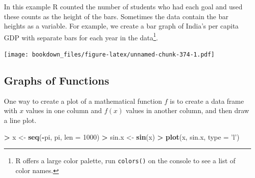 \documentclass[]{krantz}
\makeatletter
\newenvironment{Shaded}{\begin{snugshade}}{\end{snugshade}}
\newcommand{\KeywordTok}[1]{\textcolor[rgb]{0.27,0.27,0.27}{\textbf{#1}}}
\newcommand{\DataTypeTok}[1]{\textcolor[rgb]{0.27,0.27,0.27}{#1}}
\newcommand{\DecValTok}[1]{\textcolor[rgb]{0.06,0.06,0.06}{#1}}
\newcommand{\StringTok}[1]{\textcolor[rgb]{0.5,0.5,0.5}{#1}}
\newcommand{\OperatorTok}[1]{\textcolor[rgb]{0.43,0.43,0.43}{\textbf{#1}}}
\newcommand{\NormalTok}[1]{#1}
\newenvironment{kframe}{%
\medskip{}
\setlength{\fboxsep}{.8em}
 \def\at@end@of@kframe{}%
 \ifinner\ifhmode%
  \def\at@end@of@kframe{\end{minipage}}%
  \begin{minipage}{\columnwidth}%
 \fi\fi%
 \def\FrameCommand##1{\hskip\@totalleftmargin \hskip-\fboxsep
 \colorbox{shadecolor}{##1}\hskip-\fboxsep
     \hskip-\linewidth \hskip-\@totalleftmargin \hskip\columnwidth}%
 \MakeFramed {\advance\hsize-\width
   \@totalleftmargin\z@ \linewidth\hsize
   \@setminipage}}%
 {\par\unskip\endMakeFramed%
 \at@end@of@kframe}
\renewenvironment{Shaded}{\begin{kframe}}{\end{kframe}}
\makeatother
\begin{document}
In this example R counted the number of students who had each goal and
used these counts as the height of the bars. Sometimes the data contain
the bar heights as a variable. For example, we create a bar graph of
India's per capita GDP with separate bars for each year in the
data\footnote{R offers a large color palette, run \texttt{colors()} on
  the console to see a list of color names.}.

\begin{Shaded}
\end{Shaded}

\texttt{[image: bookdown\_files/figure-latex/unnamed-chunk-374-1.pdf]}

\subsection{Graphs of Functions}\label{graphs-of-functions-1}

One way to create a plot of a mathematical function \(f\) is to create a
data frame with \(x\) values in one column and \(f(x)\) values in
another column, and then draw a line plot.

\begin{Shaded}
\begin{Highlighting}[]
\OperatorTok{>}\StringTok{ }\NormalTok{x <-}\StringTok{ }\KeywordTok{seq}\NormalTok{(}\OperatorTok{-}\NormalTok{pi, pi, }\DataTypeTok{len =} \DecValTok{1000}\NormalTok{)}
\OperatorTok{>}\StringTok{ }\NormalTok{sin.x <-}\StringTok{ }\KeywordTok{sin}\NormalTok{(x)}
\OperatorTok{>}\StringTok{ }\KeywordTok{plot}\NormalTok{(x, sin.x, }\DataTypeTok{type =} \StringTok{'l'}\NormalTok{)}
\end{Highlighting}
\end{Shaded}
\end{document}
